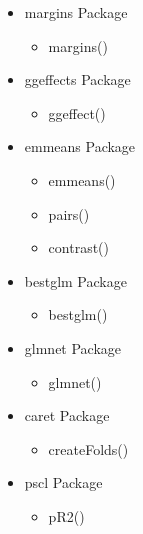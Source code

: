 \documentclass{article}
\begin{document}
\begin{multicols}{3}
\begin{itemize}
\begin{itemize}
  \end{itemize}
  \item margins Package
  \begin{itemize}
  \item margins()
  \end{itemize}
  \item ggeffects Package
  \begin{itemize}
  \item ggeffect()
  \end{itemize}
  \item emmeans Package
  \begin{itemize}
  \item emmeans()
  \item pairs()
  \item contrast()
  \end{itemize}
  \item bestglm Package
  \begin{itemize}
  \item bestglm()
  \end{itemize}
  \item glmnet Package
  \begin{itemize}
  \item glmnet()
  \end{itemize}
  \item caret Package
  \begin{itemize}
  \item createFolds()
  \end{itemize}
  \item pscl Package
  \begin{itemize}
  \item pR2()
  \end{itemize}
  \end{itemize}
  \vfill\null
  \end{multicols}
  \newpage
\end{document}
